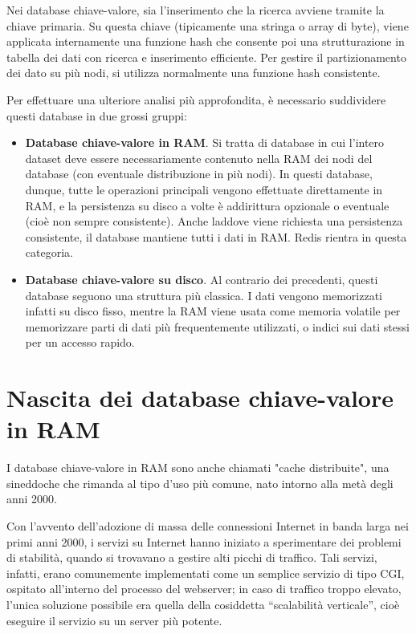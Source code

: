 Nei database chiave-valore, sia l'inserimento che la ricerca avviene tramite
la chiave primaria. Su questa chiave (tipicamente una stringa o array di byte),
viene applicata internamente una funzione hash che consente poi una strutturazione
in tabella dei dati con ricerca e inserimento efficiente. Per gestire il partizionamento
dei dato su più nodi, si utilizza normalmente una funzione hash consistente.

Per effettuare una ulteriore analisi più approfondita, è necessario suddividere
questi database in due grossi gruppi:

\begin{itemize}
	\medskip
	\item
	\textbf{Database chiave-valore in RAM}. Si tratta di database in cui l'intero dataset
	deve essere necessariamente contenuto nella RAM dei nodi del database
	(con eventuale distribuzione in più nodi). In questi database, dunque, tutte
	le operazioni principali vengono effettuate direttamente in RAM, e la persistenza
	su disco a volte è addirittura opzionale o eventuale (cioè non sempre consistente).
	Anche laddove viene richiesta una persistenza consistente, il database mantiene
	tutti i dati in RAM. Redis rientra in questa categoria.

	\item
	\textbf{Database chiave-valore su disco}. Al contrario dei precedenti, questi
	database seguono una struttura più classica. I dati vengono memorizzati infatti
	su disco fisso, mentre la RAM viene usata come memoria volatile per memorizzare
	parti di dati più frequentemente utilizzati, o indici sui dati stessi per un
	accesso rapido.
\end{itemize}

\section{Nascita dei database chiave-valore in RAM}

I database chiave-valore in RAM sono anche chiamati "cache distribuite", una sineddoche
che rimanda al tipo d'uso più comune, nato intorno alla metà degli anni 2000.

Con l'avvento dell'adozione di massa delle connessioni Internet in banda larga nei primi
anni 2000, i servizi su Internet hanno iniziato a sperimentare dei problemi di stabilità,
quando si trovavano a gestire alti picchi di traffico. Tali servizi, infatti, erano
comunemente implementati come un semplice servizio di tipo CGI, ospitato all'interno
del processo del webserver; in caso di traffico troppo elevato, l'unica soluzione possibile
era quella della cosiddetta ``scalabilità verticale'', cioè eseguire il servizio su un
server più potente.

